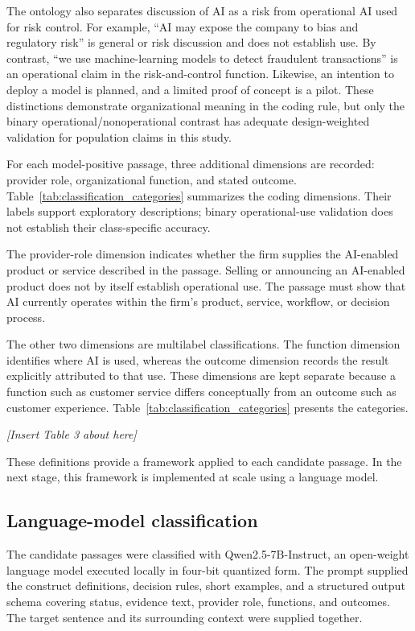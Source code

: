 \documentclass[12pt]{article}
\newcommand{\placement}[1]{%
  \begin{center}
    \vspace{0.5\baselineskip}
    \textit{[Insert #1 about here]}
    \vspace{0.5\baselineskip}
  \end{center}
}
\begin{document}
The ontology also separates discussion of AI as a risk from operational AI
used for risk control. For example, ``AI may expose the company to bias and
regulatory risk'' is general or risk discussion and does not establish use.
By contrast, ``we use machine-learning models to detect fraudulent
transactions'' is an operational claim in the risk-and-control function.
Likewise, an intention to deploy a model is planned, and a limited proof of
concept is a pilot. These distinctions demonstrate organizational meaning in
the coding rule, but only the binary operational/nonoperational contrast has
adequate design-weighted validation for population claims in this study.

For each model-positive passage, three additional dimensions are recorded:
provider role, organizational function, and stated outcome. Table~\ref{tab:classification_categories}
summarizes the coding dimensions. Their labels support exploratory descriptions;
binary operational-use validation does not establish their class-specific accuracy.

The
provider-role dimension indicates whether the firm supplies the AI-enabled
product or service described in the passage. Selling or announcing an
AI-enabled product does not by itself establish operational use. The passage
must show that AI currently operates within the firm's product, service,
workflow, or decision process.

The other two dimensions are multilabel classifications. The function
dimension identifies where AI is used, whereas the outcome dimension records
the result explicitly attributed to that use. These dimensions are kept
separate because a function such as customer service differs conceptually from
an outcome such as customer experience. Table~\ref{tab:classification_categories}
presents the categories.

\placement{Table 3}


These definitions provide a framework applied to each candidate passage. In the next stage, this framework is implemented at scale using a language model.

\subsection{Language-model classification}
\label{sec:classifier}

The candidate passages were classified with Qwen2.5-7B-Instruct, an open-weight
language model executed locally in four-bit quantized form. The prompt supplied
the construct definitions, decision rules, short examples, and a structured
output schema covering status, evidence text, provider role, functions, and
outcomes. The target sentence and its surrounding context were supplied
together.
\end{document}
